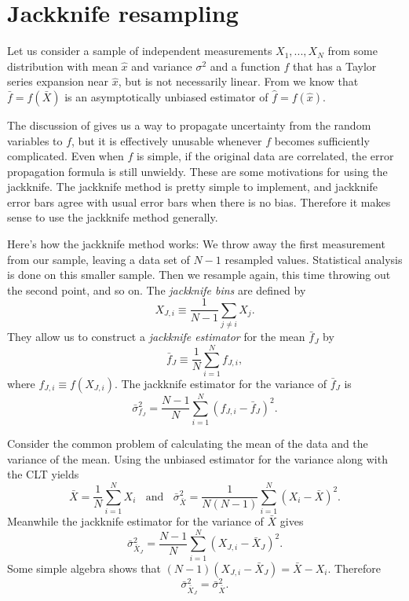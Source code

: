 \section{Jackknife resampling}
Let us consider a sample of independent measurements 
$X_1,...,X_N$ from some distribution with mean $\hat{x}$ and 
variance $\sigma^2$ and a function $f$ that has a Taylor series 
expansion near $\hat{x}$, but is not necessarily linear.
From  we know that $\bar{f}=f(\bar{X})$ is
an asymptotically unbiased estimator of $\hat{f}=f(\hat{x})$. 

The discussion of  gives us a way to propagate 
uncertainty from the random variables to $f$, but it is effectively 
unusable whenever $f$ becomes sufficiently complicated. 
Even when $f$ is simple, if the original data are correlated, the 
error propagation formula  is still 
unwieldy. These are some motivations for using the jackknife.
The jackknife method is pretty simple to implement, and jackknife error 
bars agree with usual error bars when there is no bias.
Therefore it makes sense to use the jackknife method generally. 

Here's how the jackknife method works: We throw away the first measurement 
from our sample, leaving a data set of $N-1$ resampled values. Statistical
analysis is done on this smaller sample. Then we resample again, this time
throwing out the second point, and so on.
The {\it jackknife bins} are defined by
\begin{equation}
  X_{J,i}\equiv\frac{1}{N-1}\sum_{j\neq i}X_j.
\end{equation}
They allow us to construct a {\it jackknife estimator}
 for the mean $\bar{f}_J$ by
\begin{equation}\label{eq:jackmean}
  \bar{f}_J\equiv\frac{1}{N}\sum_{i=1}^N f_{J,i},
\end{equation}
where $f_{J,i}\equiv f(X_{J,i})$. The jackknife estimator for the 
variance of $\bar{f}_J$ is
\begin{equation}\label{eq:jackvar}
  \bar\sigma^2_{f_J}=\frac{N-1}{N}\sum_{i=1}^N(f_{J,i}-\bar{f}_J)^2.
\end{equation}
\begin{example*}{}{}
  Consider the common problem of calculating the mean of the data and
  the variance of the mean. Using the unbiased estimator for the variance
  along with the CLT yields
  \begin{equation}
    \bar{X}=\frac{1}{N}\sum_{i=1}^N X_i~~~~\text{and}~~~~
     \bar{\sigma}^2_{\bar{X}}=\frac{1}{N(N-1)}\sum_{i=1}^N(X_i-\bar{X})^2.
  \end{equation}
  Meanwhile the jackknife estimator for the variance of $\bar{X}$ gives
  \begin{equation}
    \bar\sigma_{\bar{X}_J}^2=\frac{N-1}{N}\sum_{i=1}^N(X_{J,i}-\bar{X}_J)^2.
  \end{equation}
  Some simple algebra shows that $(N-1)(X_{J,i}-\bar{X}_J)=\bar{X}-X_i$.
  Therefore
  \begin{equation}
    \bar\sigma_{\bar{X}_J}^2=\bar{\sigma}^2_{\bar{X}}.
  \end{equation}
\end{example*}

